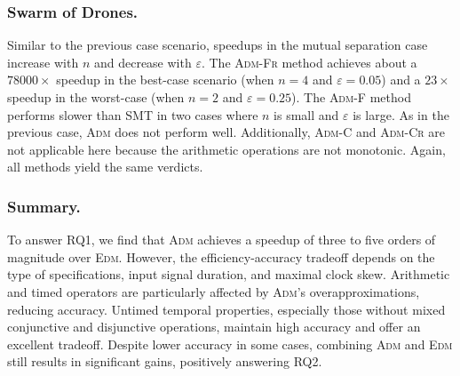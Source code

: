 \subsubsection{Swarm of Drones.}
Similar to the previous case scenario, speedups in the mutual separation case increase with \(n\) and decrease with \(\varepsilon\).
The \textsc{Adm-Fr} method achieves about a $78000\times$ speedup in the best-case scenario (when \(n=4\) and \(\varepsilon=0.05\)) and a $23\times$ speedup in the worst-case (when \(n=2\) and \(\varepsilon=0.25\)).
The \textsc{Adm-F} method performs slower than SMT in two cases where \(n\) is small and \(\varepsilon\) is large.
%
As in the previous case, \textsc{Adm} does not perform well.
Additionally, \textsc{Adm-C} and \textsc{Adm-Cr} are not applicable here because the arithmetic operations are not monotonic.
Again, all methods yield the same verdicts.

\subsubsection{Summary.}
To answer RQ1, we find that \textsc{Adm} achieves a speedup of three to five orders of magnitude over \textsc{Edm}. However, the efficiency-accuracy tradeoff depends on the type of specifications, input signal duration, and maximal clock skew. Arithmetic and timed operators are particularly affected by \textsc{Adm}'s overapproximations, reducing accuracy. Untimed temporal properties, especially those without mixed conjunctive and disjunctive operations, maintain high accuracy and offer an excellent tradeoff. Despite lower accuracy in some cases, combining \textsc{Adm} and \textsc{Edm} still results in significant gains, positively answering RQ2.


